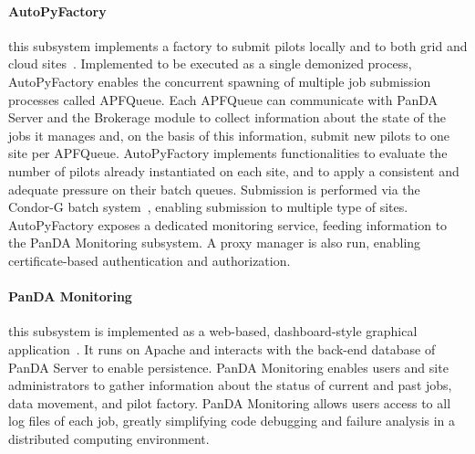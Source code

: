 \paragraph{\textbf{AutoPyFactory}} this subsystem implements a factory to submit
pilots locally and to both grid and cloud
sites~\cite{caballero2012autopyfactory}. Implemented to be executed as a single
demonized process, AutoPyFactory enables the concurrent spawning of multiple job
submission processes called APFQueue. Each APFQueue can communicate with PanDA
Server and the Brokerage module to collect information about the state of the
jobs it manages and, on the basis of this information, submit new pilots to one
site per APFQueue. AutoPyFactory implements functionalities to evaluate the
number of pilots already instantiated on each site, and to apply a consistent
and adequate pressure on their batch queues. Submission is performed via the
Condor-G batch system~\cite{frey2002condor}, enabling submission to multiple
type of sites. AutoPyFactory exposes a dedicated monitoring service, feeding
information to the PanDA Monitoring subsystem. A proxy manager is also run,
enabling certificate-based authentication and authorization.


\paragraph{\textbf{PanDA Monitoring}} this subsystem is implemented as a
web-based, dashboard-style graphical application~\cite{klimentov2011atlas}. It
runs on Apache and interacts with the back-end database of PanDA Server to
enable persistence. PanDA Monitoring enables users and site administrators to
gather information about the status of current and past jobs, data movement, and
pilot factory. PanDA Monitoring allows users access to all log files of each
job, greatly simplifying code debugging and failure analysis in a distributed
computing environment.

